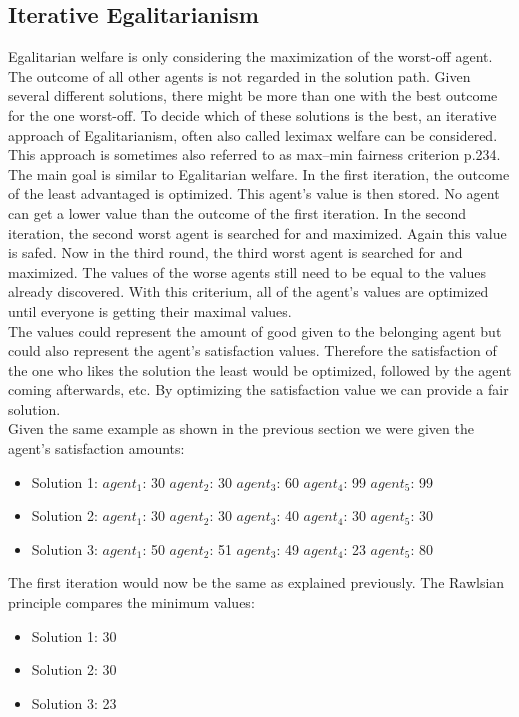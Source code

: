 \documentclass[german, a4paper, 11pt, oneside]{scrbook}
\begin{document}
\subsection{Iterative Egalitarianism}
Egalitarian welfare is only considering the maximization of the worst-off agent. The outcome of all other agents is not regarded in the solution path. Given several different solutions, there might be more than one with the best outcome for the one worst-off. To decide which of these solutions is the best, an iterative approach of Egalitarianism, often also called leximax welfare can be considered. This approach is sometimes also referred to as max–min fairness criterion \cite{.b}p.234. The main goal is similar to Egalitarian welfare. In the first iteration, the outcome of the least advantaged is optimized. This agent's value is then stored. No agent can get a lower value than the outcome of the first iteration. \cite{.b} In the second iteration, the second worst agent is searched for and maximized. Again this value is safed. Now in the third round, the third worst agent is searched for and maximized. The values of the worse agents still need to be equal to the values already discovered. With this criterium, all of the agent's values are optimized until everyone is getting their maximal values. \cite{.,FelixBrandtVincentConitzerUlleEndrissJeromeLangandArielD.Procaccia.,Chen.2020} \\The values could represent the amount of good given to the belonging agent but could also represent the agent's satisfaction values. Therefore the satisfaction of the one who likes the solution the least would be optimized, followed by the agent coming afterwards, etc. By optimizing the satisfaction value we can provide a fair solution.
\\Given the same example as shown in the previous section we were given the agent's satisfaction amounts:
\begin{itemize}
\item Solution 1: $agent_1$: 30 $agent_2$: 30  $agent_3$: 60 $agent_4$: 99 $agent_5$: 99
\item Solution 2: $agent_1$: 30 $agent_2$: 30  $agent_3$: 40 $agent_4$: 30 $agent_5$: 30
\item Solution 3: $agent_1$: 50 $agent_2$: 51  $agent_3$: 49 $agent_4$: 23 $agent_5$: 80
\end{itemize}
The first iteration would now be the same as explained previously.
The Rawlsian principle compares the minimum values:
\begin{itemize}
\item Solution 1: 30 
\item Solution 2: 30 
\item Solution 3: 23
\end{itemize}
\end{document}
